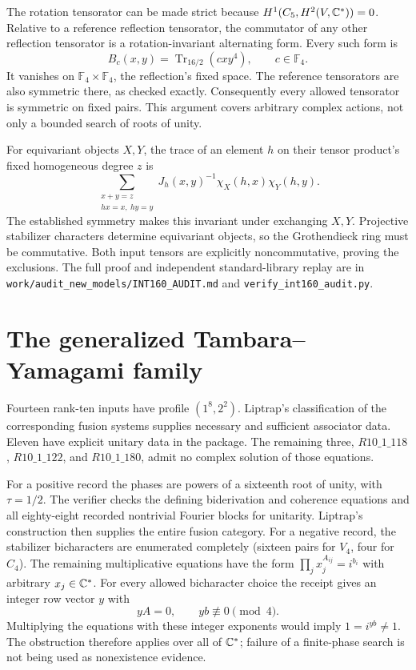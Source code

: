 The rotation tensorator can be made strict because
$H^1(C_5,H^2(V,\mathbb C^*))=0$. Relative to a reference reflection tensorator,
the commutator of any other reflection tensorator is a rotation-invariant
alternating form. Every such form is
\[
 B_c(x,y)=\operatorname{Tr}_{16/2}(cxy^4),\qquad c\in\mathbb F_4.
\]
It vanishes on $\mathbb F_4\times\mathbb F_4$, the reflection's fixed
space. The reference tensorators are also symmetric there, as checked
exactly. Consequently every allowed tensorator is symmetric on fixed pairs.
This argument covers arbitrary complex actions, not only a bounded search
of roots of unity.

For equivariant objects $X,Y$, the trace of an element $h$ on their tensor
product's fixed homogeneous degree $z$ is
\[
 \sum_{\substack{x+y=z\\hx=x,\ hy=y}}
 J_h(x,y)^{-1}\chi_X(h,x)\chi_Y(h,y).
\]
The established symmetry makes this invariant under exchanging $X,Y$.
Projective stabilizer characters determine equivariant objects, so the
Grothendieck ring must be commutative. Both input tensors are explicitly
noncommutative, proving the exclusions. The full proof and independent
standard-library replay are in \nolinkurl{work/audit_new_models/INT160_AUDIT.md}
and \nolinkurl{verify_int160_audit.py}.

\section{The generalized Tambara--Yamagami family}
Fourteen rank-ten inputs have profile $(1^8,2^2)$. Liptrap's classification
of the corresponding fusion systems supplies necessary and sufficient
associator data. Eleven have explicit unitary data in the package. The
remaining three, $R10\_1\_118$, $R10\_1\_122$, and $R10\_1\_180$, admit no
complex solution of those equations.

For a positive record the phases are powers of a sixteenth root of unity,
with $\tau=1/2$. The verifier checks the defining biderivation and coherence
equations and all eighty-eight recorded nontrivial Fourier blocks for
unitarity. Liptrap's construction then supplies the entire fusion category.
For a negative record, the stabilizer bicharacters are enumerated completely
(sixteen pairs for $V_4$, four for $C_4$). The remaining multiplicative
equations have the form $\prod_jx_j^{A_{ij}}=i^{b_i}$ with arbitrary
$x_j\in\mathbb C^*$. For every allowed bicharacter choice the receipt gives an
integer row vector $y$ with
\[
 yA=0,\qquad yb\not\equiv0\pmod4.
\]
Multiplying the equations with these integer exponents would imply
$1=i^{yb}\ne1$. The obstruction therefore applies over all of $\mathbb C^*$;
failure of a finite-phase search is not being used as nonexistence evidence.

